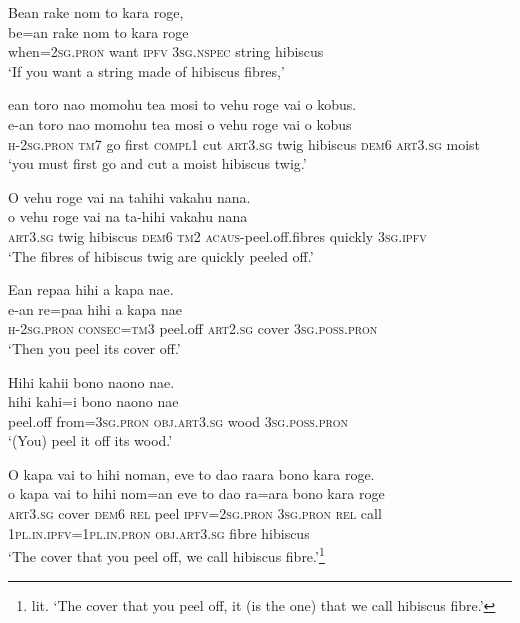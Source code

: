 \ea\label{ex:text8-1}
Bean rake nom to kara roge,\\
\gll be=an	rake	nom	to	kara	roge\\
     when=2\textsc{sg}.\textsc{pron}	want	\textsc{ipfv}	3\textsc{sg}.\textsc{nspec}	string	hibiscus\\
\glt `If you want a string made of hibiscus fibres,'
\z

\ea\label{ex:text8-2}
ean toro nao momohu tea mosi to vehu roge vai o kobus.\\
\gll e-an	toro	nao	momohu	tea	mosi	o	vehu	roge	vai	o	kobus\\
     \textsc{h}-2\textsc{sg}.\textsc{pron}	\textsc{tm}7	go	first	\textsc{compl}1	cut	\textsc{art}3.\textsc{sg}	twig	hibiscus	\textsc{dem}6	\textsc{art}3.\textsc{sg}	moist\\
\glt `you must first go and cut a moist hibiscus twig.'
\z

\ea\label{ex:text8-3}
O vehu roge vai na tahihi vakahu nana.\\
\gll o	vehu	roge	vai	na	ta-hihi	vakahu	nana\\
     \textsc{art}3.\textsc{sg}	twig	hibiscus	\textsc{dem}6	\textsc{tm}2	\textsc{acaus}-peel.off.fibres	quickly	3\textsc{sg}.\textsc{ipfv}\\
\glt `The fibres of hibiscus twig are quickly peeled off.'
\z

\ea\label{ex:text8-4}
Ean repaa hihi a kapa nae.\\
\gll e-an	re=paa	hihi	a	kapa	nae\\
     \textsc{h}-2\textsc{sg}.\textsc{pron}	\textsc{consec}=\textsc{tm}3	peel.off	\textsc{art}2.\textsc{sg}	cover	3\textsc{sg}.\textsc{poss}.\textsc{pron}\\
\glt `Then you peel its cover off.'
\z

\ea\label{ex:text8-5}
Hihi kahii bono naono nae.\\
\gll hihi	kahi=i	bono	naono	nae\\
     peel.off	from=3\textsc{sg}.\textsc{pron}	\textsc{obj}.\textsc{art}3.\textsc{sg}	wood	3\textsc{sg}.\textsc{poss}.\textsc{pron}\\
\glt `(You) peel it off its wood.'
\z

\ea\label{ex:text8-6}
O kapa vai to hihi noman, eve to dao raara bono kara roge.\\
\gll o	kapa	vai	to	hihi	nom=an	eve	to	dao	ra=ara	bono	kara	roge\\
     \textsc{art}3.\textsc{sg}	cover	\textsc{dem}6	\textsc{rel}	peel	\textsc{ipfv}=2\textsc{sg}.\textsc{pron}	3\textsc{sg}.\textsc{pron}	\textsc{rel}	call	1\textsc{pl}.\textsc{in}.\textsc{ipfv}=1\textsc{pl}.\textsc{in}.\textsc{pron}	\textsc{obj}.\textsc{art}3.\textsc{sg}	fibre	hibiscus\\
\glt `The cover that you peel off, we call hibiscus fibre.'\footnote{lit. `The cover that you peel off, it (is the one) that we call hibiscus fibre.'}
\z

